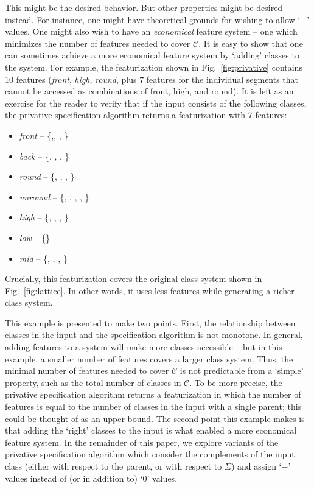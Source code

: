 \documentclass[11pt, oneside]{article}   	%
\begin{document}
This might be the desired behavior. But other properties might be desired instead. For instance, one might have theoretical grounds for wishing to allow `$-$' values. One might also wish to have an \textit{economical} feature system -- one which minimizes the number of features needed to cover $\mathcal C$. It is easy to show that one can sometimes achieve a more economical  feature system by `adding' classes to the system. For example, the featurization shown in Fig.~\ref{fig:privative} contains 10 features (\textit{front}, \textit{high}, \textit{round}, plus 7 features for the individual segments that cannot be accessed as combinations of front, high, and round). It is left as an exercise for the reader to verify that if the input consists of the following classes, the privative specification algorithm returns a featurization with 7 features: \begin{itemize}
    \item \textit{front} -- \{,, , \textipa{\oe}\}
    \item \textit{back} -- \{, , , \}
    \item \textit{round} -- \{, , \textipa{\oe}, \}
    \item \textit{unround} --  \{, , , , \}
    \item \textit{high} --  \{, , , \}
    \item \textit{low} -- \{\}
    \item \textit{mid} --  \{, \textipa{\oe}, , \}
    \end{itemize}
Crucially, this featurization covers the original class system shown in Fig.~\ref{fig:lattice}. In other words, it uses less features while generating a richer class system.

This example is presented to make two points. First, the relationship between classes in the input and the specification algorithm is not monotone. In general, adding features to a system will make more classes accessible -- but in this example, a smaller number of features covers a larger class system. Thus, the minimal number of features needed to cover $\mathcal C$ is not predictable from a `simple' property, such as the total number of classes in $\mathcal C$. To be more precise, the privative specification algorithm returns a featurization in which the number of features is equal to the number of classes in the input with a single parent; this could be thought of as an upper bound. The second point this example makes is that adding the `right' classes to the input is what enabled a more economical feature system. In the remainder of this paper, we explore variants of the privative specification algorithm which consider the complements of the input class (either with respect to the parent, or with respect to $\Sigma$) and assign `$-$' values instead of (or in addition to) `$0$' values.
\end{document}
